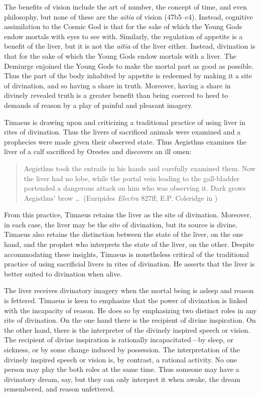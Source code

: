 The benefits of vision include the art of number, the concept of time, and even philosophy, but none of these are the \emph{aitia} of vision (47b5--c4). Instead, cognitive assimilation to the Cosmic God is that for the sake of which the Young Gods endow mortals with eyes to see with. Similarly, the regulation of appetite is a benefit of the liver, but it is not the \emph{aitia} of the liver either. Instead, divination is that for the sake of which the Young Gods endow mortals with a liver. The Demiurge enjoined the Young Gods to make the mortal part as good as possible. Thus the part of the body inhabited by appetite is redeemed by making it a site of divination, and so having a share in truth. Moreover, having a share in divinely revealed truth is a greater benefit than being coerced to heed to demands of reason by a play of painful and pleasant imagery.

Timaeus is drawing upon and criticizing a traditional practice of using liver in rites of divination. Thus the livers of sacrificed animals were examined and a prophecies were made given their observed state. Thus Aegisthus examines the liver of a calf sacrificed by Orestes and discovers an ill omen:
\begin{quote}
	Aegisthus took the entrails in his hands and carefully examined them. Now the liver had no lobe, while the portal vein leading to the gall-bladder portended a dangerous attack on him who was observing it. Dark grows Aegis\-thus' brow \ldots\ (Euripides \emph{Electra} 827ff; E.P. Coleridge in \citealt[92]{Oates:1938la})
\end{quote}
From this practice, Timaeus retains the liver as the site of divination. Moreover, in each case, the liver may be the site of divination, but its source is divine. Timaeus also retains the distinction between the state of the liver, on the one hand, and the prophet who interprets the state of the liver, on the other. Despite accommodating these insights, Timaeus is nonetheless critical of the traditional practice of using sacrificial livers in rites of divination. He asserts that the liver is better suited to divination when alive.

The liver receives divinatory imagery when the mortal being is asleep and reason is fettered. Timaeus is keen to emphasize that the power of divination is linked with the incapacity of reason. He does so by emphasizing two distinct roles in any rite of divination. On the one hand there is the recipient of divine inspiration. On the other hand, there is the interpreter of the divinely inspired speech or vision. The recipient of divine inspiration is rationally incapacitated---by sleep, or sickness, or by some change induced by possession. The interpretation of the divinely inspired speech or vision is, by contrast, a rational activity. No one person may play the both roles at the same time. Thus someone may have a divinatory dream, say, but they can only interpret it when awake, the dream remembered, and reason unfettered.

